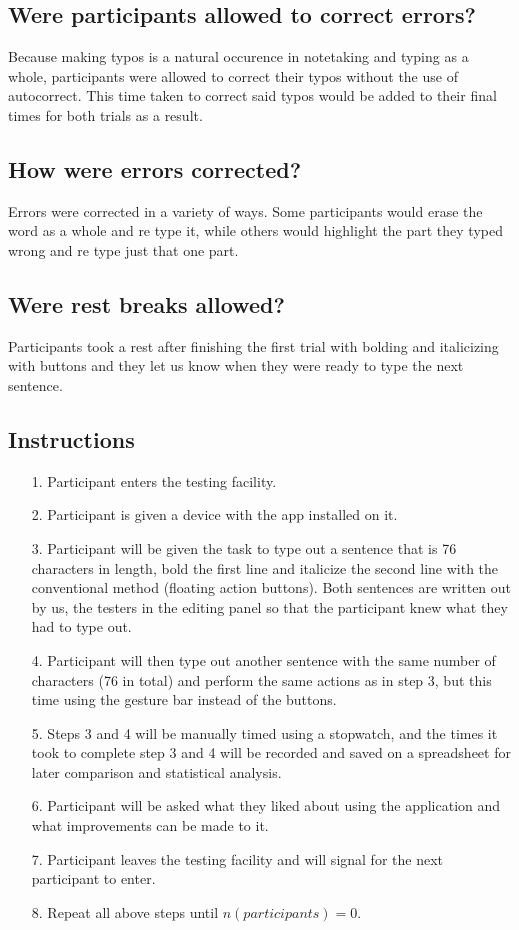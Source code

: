\documentclass[conference]{IEEEtran}
\begin{document}
\subsection*{Were participants allowed to correct errors?}
Because making typos is a natural occurence in notetaking and typing as a whole, participants were allowed to correct their typos without the use of autocorrect. This time taken to correct said typos would be added to their final times for both trials as a result.

\subsection*{How were errors corrected?}
Errors were corrected in a variety of ways. Some participants would erase the word as a whole and re type it, while others would highlight the part they typed wrong and re type just that one part.

\subsection*{Were rest breaks allowed?}

Participants took a rest after finishing the first trial with bolding and italicizing with buttons and they let us know when they were ready to type the next sentence.

\subsection*{Instructions}

\begin{itemize}
    \item[1.] Participant enters the testing facility.
    \item[2.] Participant is given a device with the app installed on it.
    \item[3.] Participant will be given the task to type out a sentence that is 76 characters in length, bold the first line and italicize the second line with the conventional method (floating action buttons). Both sentences are written out by us, the testers in the editing panel so that the participant knew what they had to type out.
    \item[4.] Participant will then type out another sentence with the same number of characters (76 in total) and perform the same actions as in step 3, but this time using the gesture bar instead of the buttons.
    \item[5.] Steps 3 and 4 will be manually timed using a stopwatch, and the times it took to complete step 3 and 4 will be recorded and saved on a spreadsheet for later comparison and statistical analysis.
    \item[6.] Participant will be asked what they liked about using the application and what improvements can be made to it.
    \item[7.] Participant leaves the testing facility and will signal for the next participant to enter.
    \item[8.] Repeat all above steps until $n(participants)=0$.
\end{itemize}
\end{document}
